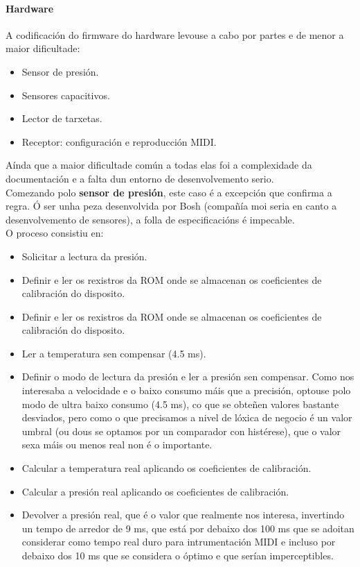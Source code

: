    \paragraph{Hardware}
   
   A codificación do firmware do hardware levouse a cabo por partes e de menor
   a maior dificultade:
   
   \begin{itemize}
    \item Sensor de presión.
    \item Sensores capacitivos.
    \item Lector de tarxetas.
    \item Receptor: configuración e reproducción MIDI.
   \end{itemize}
   
   Aínda que a maior dificultade común a todas elas foi a complexidade da
   documentación e a falta dun entorno de desenvolvemento serio. \\
   
   Comezando polo \textbf{sensor de presión}, este caso é a excepción que 
   confirma a regra. Ó ser unha peza desenvolvida por Bosh (compañía moi seria
   en canto a desenvolvemento de sensores), a folla de especificacións
   \cite{Bmp085DataSheet} é impecable. \\
   
    O proceso consistiu en:
    
    \begin{itemize}
    \item Solicitar a lectura da presión.
    \item Definir e ler os rexistros da ROM onde se almacenan os coeficientes de
        calibración do disposito.
    \item Definir e ler os rexistros da ROM onde se almacenan os coeficientes de
        calibración do disposito.
    \item Ler a temperatura sen compensar (4.5 ms).
    \item Definir o modo de lectura da presión e ler a presión sen compensar.
        Como nos interesaba a velocidade e o baixo consumo máis que a precisión,
        optouse polo modo de ultra baixo consumo (4.5 ms), co que se obteñen
        valores bastante desviados, pero como o que precisamos a nivel de lóxica
        de negocio é un valor umbral (ou dous se optamos por un comparador con
        histérese), que o valor sexa máis ou menos real non é o importante.
    \item Calcular a temperatura real aplicando os coeficientes de calibración.
    \item Calcular a presión real aplicando os coeficientes de calibración.
    \item Devolver a presión real, que é o valor que realmente nos interesa,
        invertindo un tempo de arredor de 9 ms, que está por debaixo dos 100 ms
        que se adoitan considerar como tempo real duro para intrumentación MIDI
        e incluso por debaixo dos 10 ms que se considera o óptimo e que serían
        imperceptibles.
   \end{itemize}
   
